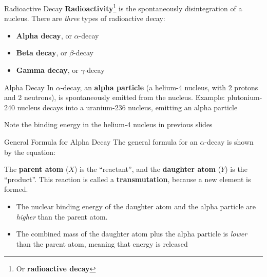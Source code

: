 \documentclass[12pt,compress,aspectratio=169]{beamer}
\begin{document}
\begin{frame}{Radioactive Decay}
  \textbf{Radioactivity}\footnote{Or \textbf{radioactive decay}} is the
  spontaneously disintegration of a nucleus. There are \emph{three} types of
  radioactive decay:
  \begin{itemize}
  \item\textbf{Alpha decay}, or $\alpha$-decay
  \item\textbf{Beta decay}, or $\beta$-decay
  \item\textbf{Gamma decay}, or $\gamma$-decay
  \end{itemize}
\end{frame}



\begin{frame}{Alpha Decay}
  In $\alpha$-decay, an \textbf{alpha particle} (a helium-4 nucleus, with 2
  protons and 2 neutrons), is spontaneously emitted from the nucleus. Example:
  plutonium-240 nucleus decays into a uranium-236 nucleus, emitting an alpha
  particle
  \begin{center}
  \end{center}


  Note the binding energy in the helium-4 nucleus in previous slides
\end{frame}



\begin{frame}{General Formula for Alpha Decay}
  The general formula for an $\alpha$-decay is shown by the equation:
  
  
  The \textbf{parent atom} ($X$) is the ``reactant'', and the
  \textbf{daughter atom} ($Y$) is the ``product''. This reaction is called a
  \textbf{transmutation}, because a new element is formed.
  \begin{itemize}
  \item The nuclear binding energy of the daughter atom and the alpha
    particle are \emph{higher} than the parent atom.
  \item The combined mass of the daughter atom plus the alpha particle is
    \emph{lower} than the parent atom, meaning that energy is released
  \end{itemize}
\end{frame}
\end{document}
